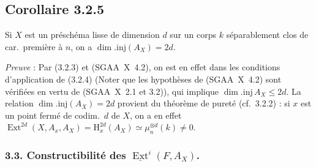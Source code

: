 \documentclass[11pt]{article}
\renewcommand{\H}{\mathrm{H}}
\DeclareMathOperator{\Ext}{Ext}
\begin{document}
\subsection*{Corollaire 3.2.5}
Si $X$ est un préschéma lisse de dimension $d$ sur un corps $k$ séparablement clos de car.~première à $n$, on a $\dim.\mathrm{inj}(A_X) = 2d$.

\emph{Preuve} : Par (3.2.3) et (SGAA~X~4.2), on est en effet dans les conditions d'application de (3.2.4) (Noter que les hypothèses de (SGAA~X~4.2) sont vérifiées en vertu de (SGAA~X~2.1 et 3.2)), qui implique $\dim.\mathrm{inj}\, A_X \leqslant 2d$. La relation $\dim.\mathrm{inj}(A_X) = 2d$ provient du théorème de pureté (cf.~3.2.2) : si $x$ est un point fermé de codim.~$d$ de $X$, on a en effet $\Ext^{2d}(X, A_x, A_X) = \H^{2d}_x(A_X) \simeq \mu_n^{\otimes d}(k) \neq 0$.

\subsubsection*{3.3. Constructibilité des \texorpdfstring{$\underline{\Ext}^i(F, A_X)$}{Ext i(F, A\_X)}.}
\end{document}

